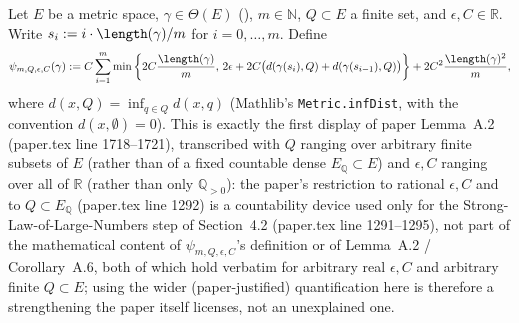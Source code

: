 \begin{definition}
  Let $E$ be a metric space, $\gamma \in \Theta(E)$ (), $m \in \mathbb{N}$,
  $Q \subset E$ a finite set, and $\epsilon, C \in \mathbb{R}$. Write $s_i := i \cdot
  \length(\gamma)/m$ for $i = 0,\dotsc,m$. Define
  \[
    \psi_{m,Q,\epsilon,C}(\gamma) := C\sum_{i=1}^m \min \left\{ 2C \frac{\length(\gamma)}{m}, \,
      2\epsilon+ 2C\bigl(d(\gamma(s_i),Q) + d(\gamma(s_{i-1}),Q)\bigr) \right\}
      + 2C^2\frac{\length(\gamma)^2}{m}
    ,
  \]
  where $d(x,Q) = \inf_{q \in Q} d(x,q)$ (Mathlib's \texttt{Metric.infDist}, with the convention
  $d(x,\emptyset) = 0$). This is exactly the first display of paper Lemma~A.2 (paper.tex line
  1718--1721), transcribed with $Q$ ranging over arbitrary finite subsets of $E$ (rather than of a
  fixed countable dense $E_{\mathbb{Q}} \subset E$) and $\epsilon, C$ ranging over all of
  $\mathbb{R}$ (rather than only $\mathbb{Q}_{>0}$): the paper's restriction to rational $\epsilon,
  C$ and to $Q \subset E_{\mathbb{Q}}$ (paper.tex line 1292) is a countability device used only for
  the Strong-Law-of-Large-Numbers step of Section~4.2 (paper.tex line 1291--1295), not part of the
  mathematical content of $\psi_{m,Q,\epsilon,C}$'s definition or of Lemma~A.2 / Corollary~A.6, both
  of which hold verbatim for arbitrary real $\epsilon, C$ and arbitrary finite $Q \subset E$; using
  the wider (paper-justified) quantification here is therefore a strengthening the paper itself
  licenses, not an unexplained one.
\end{definition}
